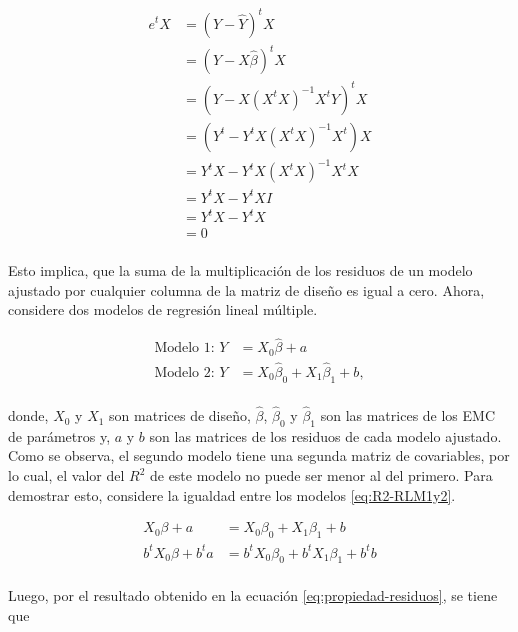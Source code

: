 \documentclass[
  11pt,
]{book}
\theoremstyle{definition}
\theoremstyle{definition}
\theoremstyle{definition}
\theoremstyle{definition}
\theoremstyle{remark}
\begin{document}
\begin{equation}
\begin{split}
e^tX &= (Y - \widehat{Y})^tX\\
&= (Y - X\widehat{\beta})^tX\\
&= (Y - X(X^tX)^{-1}X^tY)^tX\\
&= (Y^t - Y^tX(X^tX)^{-1}X^t)X\\
&= Y^tX - Y^tX(X^tX)^{-1}X^tX\\
&= Y^tX - Y^tXI\\
&= Y^tX - Y^tX\\
&= 0\\
\end{split}
\label{eq:propiedad-residuos}
\end{equation}

Esto implica, que la suma de la multiplicación de los residuos de un modelo ajustado por cualquier columna de la matriz de diseño es igual a cero. Ahora, considere dos modelos de regresión lineal múltiple.

\begin{equation}
\begin{split}
\text{Modelo 1: } Y &= X_0\widehat{\beta} + a\\
\text{Modelo 2: } Y &= X_0\widehat{\beta}_0 + X_1\widehat{\beta}_1 + b,\\
\end{split}
\label{eq:R2-RLM1y2}
\end{equation}

donde, \(X_0\) y \(X_1\) son matrices de diseño, \(\widehat{\beta}\), \(\widehat{\beta}_0\) y \(\widehat{\beta}_1\) son las matrices de los EMC de parámetros y, \(a\) y \(b\) son las matrices de los residuos de cada modelo ajustado. Como se observa, el segundo modelo tiene una segunda matriz de covariables, por lo cual, el valor del \(R^2\) de este modelo no puede ser menor al del primero. Para demostrar esto, considere la igualdad entre los modelos \eqref{eq:R2-RLM1y2}.

\begin{equation}
\begin{split}
X_0\beta + a &= X_0\beta_0 + X_1\beta_1 + b\\
b^tX_0\beta + b^ta &= b^tX_0\beta_0 + b^tX_1\beta_1 + b^tb\\
\end{split}
\label{eq:igualacion-modelos1}
\end{equation}

Luego, por el resultado obtenido en la ecuación \eqref{eq:propiedad-residuos}, se tiene que
\end{document}
